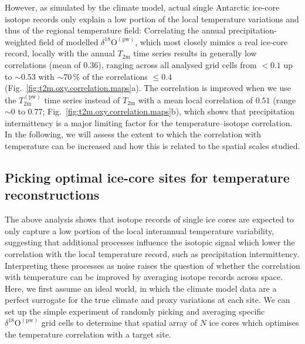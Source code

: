 \documentclass[cp, manuscript]{copernicus}
\begin{document}
However, as simulated by the climate model, actual single Antarctic ice-core
isotope records only explain a low portion of the local temperature variations
and thus of the regional temperature field: Correlating the annual
precipitation-weighted field of modelled
$\delta^{18}\mathrm{O}^{\mathrm{(pw)}}$, which most closely mimics a real
ice-core record, locally with the annual $T_{2\mathrm{m}}$ time series results
in generally low correlations (mean of $0.36$), ranging across all analysed grid
cells from $<0.1$ up to $\sim0.53$ with $\sim70\,\%$ of the correlations
$\leq0.4$ (Fig.~\ref{fig:t2m.oxy.correlation.maps}a). The correlation is
improved when we use the $T_{2\mathrm{m}}^{\mathrm{(pw)}}$ time series instead
of $T_{2\mathrm{m}}$ with a mean local correlation of $0.51$ (range $\sim0$ to
$0.77$; Fig.~\ref{fig:t2m.oxy.correlation.maps}b), which shows that
precipitation intermittency is a major limiting factor for the
temperature--isotope correlation. In the following, we will assess the extent to
which the correlation with temperature can be increased and how this is related
to the spatial scales studied.

\subsection{Picking optimal ice-core sites for temperature reconstructions}
\label{results:picking}

The above analysis shows that isotope records of single ice cores are expected
to only capture a low portion of the local interannual temperature variability,
suggesting that additional processes influence the isotopic signal which lower
the correlation with the local temperature record, such as precipitation
intermittency. Interpreting these processes as noise raises the question of
whether the correlation with temperature can be improved by averaging isotope
records across space. Here, we first assume an ideal world, in which the climate
model data are a perfect surrogate for the true climate and proxy variations at
each site. We can set up the simple experiment of randomly picking
and averaging specific $\delta^{18}\mathrm{O}^{\mathrm{(pw)}}$ grid cells to
determine that spatial array of $N$ ice cores which optimises the temperature
correlation with a target site.
\end{document}
